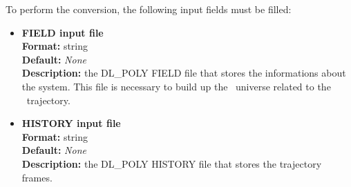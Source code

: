 \documentclass[a4paper,11pt]{report}
\begin{document}
To perform the conversion, the following input fields must be filled:
\hypertarget{dlpoly_converter_field_input_file}{}
\begin{itemize}
\item \textbf{FIELD input file}\\
\textbf{Format:} string\\
\textbf{Default:} \textit{None}\\
\textbf{Description:} the DL\_POLY FIELD file that stores the informations about the system. This file is necessary to build up 
the \MMTK\ universe related to the \MMTK\ trajectory.

\hypertarget{dlpoly_converter_history_input_file}{}
\item \textbf{HISTORY input file}\\
\textbf{Format:} string\\
\textbf{Default:} \textit{None}\\
\textbf{Description:} the DL\_POLY HISTORY file that stores the trajectory frames.


\end{itemize}
\end{document}
